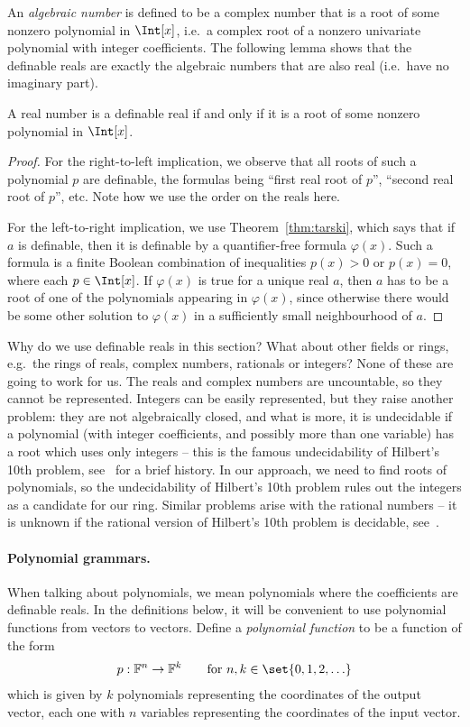 An \emph{algebraic number} is defined to be a complex number that is a root of some nonzero polynomial in $\Int[x]$, i.e.~a complex root of a nonzero univariate polynomial with integer coefficients. The following lemma shows that the definable reals are exactly the algebraic numbers that are also real (i.e.~have no imaginary part).
\begin{lemma}\label{lem:}
A real number is a definable real if and only if it is a root of  some  nonzero polynomial in $\Int[x]$. 
\end{lemma}
\begin{proof}
For the right-to-left implication, we observe that all roots of such a polynomial $p$ are definable, the formulas being ``first real root of $p$'', ``second real root of $p$'', etc. Note how we use the order on the reals here.

For the left-to-right implication, we use Theorem~\ref{thm:tarski}, which says that if $a$ is definable, then it is definable by a quantifier-free formula $\varphi(x)$. Such a formula is a finite Boolean combination of inequalities $p(x) > 0$ or $p(x) = 0$, where each $p \in \Int[x]$. If $\varphi(x)$ is true for a unique real $a$, then $a$ has to be a root of one of the polynomials appearing in $\varphi(x)$, since otherwise there would be some other solution to $\varphi(x)$ in a sufficiently small neighbourhood of $a$.
\end{proof}


Why do we use definable reals in this section?
What about other fields or rings, e.g.~the rings of reals, complex numbers, rationals or 
integers? None of these are going to work for us. The reals and complex numbers are uncountable, so they cannot be represented. Integers can be easily represented, but they raise another problem: they are not algebraically closed, and what is more, it is undecidable if a polynomial (with integer coefficients, and possibly more than one variable) has a root which uses  only integers --  this is the famous undecidability of  Hilbert's 10th problem, see~\cite{Poonen:2008wc} for a brief history. In our approach, we  need to find roots of polynomials, so the undecidability of Hilbert's 10th problem  rules out the integers as a candidate for our ring.  Similar problems arise with the rational numbers -- it is unknown if the rational version of Hilbert's 10th problem is decidable, see~\cite[p.~348]{Poonen:2008wc}.


\paragraph*{Polynomial grammars.} 
When talking about  polynomials, we mean polynomials where  the coefficients are definable reals.
 In the definitions below, it will be  convenient to use polynomial functions from vectors to vectors. Define a \emph{polynomial function} to be a function of the form
\begin{align*}
  p : \definablereal^n \to \definablereal^k \qquad \text{for }n,k \in \set{0,1,2,\ldots}
\end{align*}
which is given by $k$ polynomials representing the coordinates of the output vector, each one with $n$ variables representing the coordinates of the input vector. 


